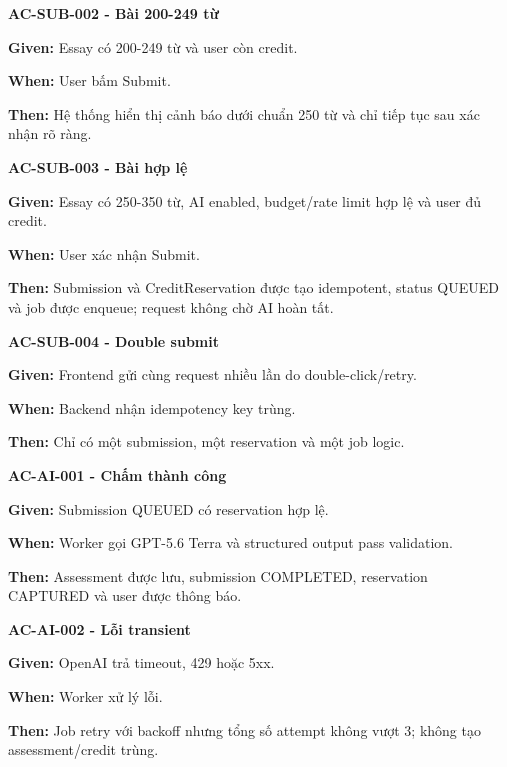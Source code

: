 \documentclass[11pt,a4paper]{article}
\begin{document}
\begin{acceptancebox}
\textbf{AC-SUB-002 - Bài 200-249 từ}\par
\textbf{Given:} Essay có 200-249 từ và user còn credit.\par
\textbf{When:} User bấm Submit.\par
\textbf{Then:} Hệ thống hiển thị cảnh báo dưới chuẩn 250 từ và chỉ tiếp tục sau xác nhận rõ ràng.
\end{acceptancebox}

\begin{acceptancebox}
\textbf{AC-SUB-003 - Bài hợp lệ}\par
\textbf{Given:} Essay có 250-350 từ, AI enabled, budget/\allowbreak{}rate limit hợp lệ và user đủ credit.\par
\textbf{When:} User xác nhận Submit.\par
\textbf{Then:} Submission và CreditReservation được tạo idempotent, status QUEUED và job được enqueue; request không chờ AI hoàn tất.
\end{acceptancebox}

\begin{acceptancebox}
\textbf{AC-SUB-004 - Double submit}\par
\textbf{Given:} Frontend gửi cùng request nhiều lần do double-click/\allowbreak{}retry.\par
\textbf{When:} Backend nhận idempotency key trùng.\par
\textbf{Then:} Chỉ có một submission, một reservation và một job logic.
\end{acceptancebox}

\begin{acceptancebox}
\textbf{AC-AI-001 - Chấm thành công}\par
\textbf{Given:} Submission QUEUED có reservation hợp lệ.\par
\textbf{When:} Worker gọi GPT-5.6 Terra và structured output pass validation.\par
\textbf{Then:} Assessment được lưu, submission COMPLETED, reservation CAPTURED và user được thông báo.
\end{acceptancebox}

\begin{acceptancebox}
\textbf{AC-AI-002 - Lỗi transient}\par
\textbf{Given:} OpenAI trả timeout, 429 hoặc 5xx.\par
\textbf{When:} Worker xử lý lỗi.\par
\textbf{Then:} Job retry với backoff nhưng tổng số attempt không vượt 3; không tạo assessment/\allowbreak{}credit trùng.
\end{acceptancebox}
\end{document}
